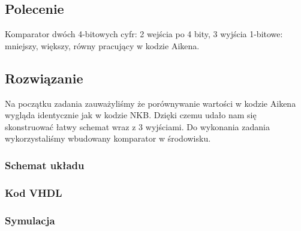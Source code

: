 \documentclass[a4paper,12pt]{extarticle}  %
\begin{document}
\subsection{Polecenie}
Komparator dwóch 4-bitowych cyfr: 2 wejścia po 4 bity, 3 wyjścia 1-bitowe: 
mniejszy, większy, równy pracujący w kodzie Aikena.
\subsection{Rozwiązanie}
Na początku zadania zauważyliśmy że porównywanie wartości w kodzie Aikena wygląda identycznie jak w kodzie NKB.
Dzięki czemu udało nam się skonstruować łatwy schemat wraz z 3 wyjściami.
Do wykonania zadania wykorzystaliśmy wbudowany komparator w środowisku.
\subsubsection{Schemat układu}
\begin{figure}[H]
   \centering
\end{figure}
\subsubsection{Kod VHDL}

\subsubsection{Symulacja}
\begin{figure}[H]
   \centering
\end{figure}
\end{document}
